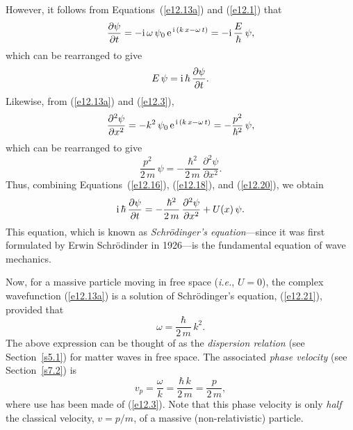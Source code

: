 However, it follows from Equations~(\ref{e12.13a}) and (\ref{e12.1}) that
\begin{equation}
\frac{\partial \psi}{\partial t} = -{\rm i}\,\omega\,\psi_0\,{\rm e}^{\,{\rm i}\,(k\,x-\omega\,t)} =- {\rm i}\,\frac{E}{\hbar}\,\psi,
\end{equation}
which can be rearranged to give
\begin{equation}\label{e12.18}
E\,\psi= {\rm i}\,\hbar\,\frac{\partial\psi}{\partial t}.
\end{equation}
Likewise, from (\ref{e12.13a}) and (\ref{e12.3}), 
\begin{equation}
\frac{\partial^2\psi}{\partial x^2} = - k^2\,\psi_0 \,{\rm e}^{\,{\rm i}\,(k\,x-\omega\,t)} = - \frac{p^2}{\hbar^2}\,\psi,
\end{equation}
which can be rearranged to give
\begin{equation}\label{e12.20}
\frac{p^2}{2\,m}\,\psi = -\frac{\hbar^2}{2\,m}\,\frac{\partial^2\psi}{\partial x^2}.
\end{equation}
Thus, combining Equations~(\ref{e12.16}), (\ref{e12.18}), and (\ref{e12.20}), we obtain
\begin{equation}\label{e12.21}
{\rm i}\,\hbar\,\frac{\partial\psi}{\partial t} = -\frac{\hbar^2}{2\,m}\,\frac{\partial^2\psi}{\partial x^2} + U(x)\,\psi.
\end{equation}
This equation, which is known as {\em Schr\"{o}dinger's equation}---since it was first formulated  by Erwin Schr\"{o}dinder in 1926---is the fundamental equation of wave mechanics.

Now, for a massive particle moving  in free space ({\em i.e.}, $U=0$), the complex wavefunction (\ref{e12.13a}) is a
solution of Schr\"{o}dinger's equation, (\ref{e12.21}), provided that
\begin{equation}\label{e12.25r}
\omega = \frac{\hbar}{2\,m}\,k^2.
\end{equation}
The above expression can be thought of as the {\em dispersion relation}\/ (see Section~\ref{s5.1}) for matter waves in free space. The
associated {\em phase velocity}\/ (see Section~\ref{s7.2}) is
\begin{equation}\label{e12.26r}
v_p = \frac{\omega}{k} = \frac{\hbar\,k}{2\,m} = \frac{p}{2\,m},
\end{equation}
where use has been made of (\ref{e12.3}). Note that this phase velocity is only {\em half}\/ the classical velocity, $v=p/m$,
of a massive (non-relativistic) particle.

